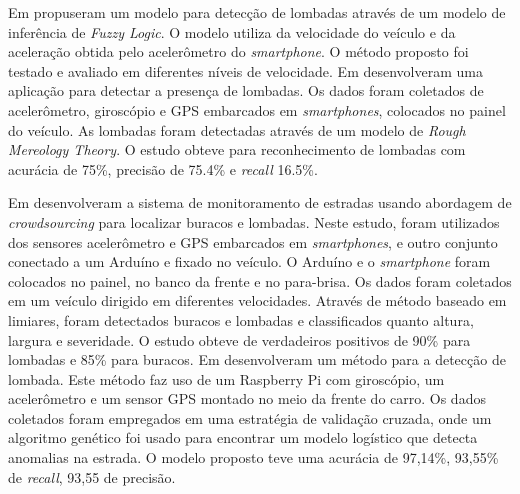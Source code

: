 Em \cite{Aljaafreh2017} propuseram um modelo para detecção de lombadas através de um modelo de inferência de \textit{Fuzzy Logic}. O modelo utiliza da velocidade do veículo e da aceleração obtida pelo acelerômetro do \textit{smartphone}. O método proposto foi testado e avaliado em diferentes níveis de velocidade. Em \cite{Fouad2014} desenvolveram uma aplicação para detectar a presença de lombadas. Os dados foram coletados de acelerômetro, giroscópio e GPS embarcados em \textit{smartphones}, colocados no painel do veículo. As lombadas foram detectadas através de um modelo de \textit{Rough Mereology Theory}. O estudo obteve para reconhecimento de lombadas com acurácia de 75\%, precisão de 75.4\% e \textit{recall} 16.5\%.

Em \cite{Sabir2019} desenvolveram a sistema de monitoramento de estradas usando abordagem de \textit{crowdsourcing} para localizar buracos e lombadas. Neste estudo, foram utilizados dos sensores acelerômetro e GPS embarcados em \textit{smartphones}, e outro conjunto conectado a um Arduíno e fixado no veículo. O Arduíno e o \textit{smartphone} foram colocados no painel, no banco da frente e no para-brisa. Os dados foram coletados em um veículo dirigido em diferentes velocidades. Através de método baseado em limiares, foram detectados buracos e lombadas e classificados quanto altura, largura e severidade. O estudo obteve de verdadeiros positivos de 90\% para lombadas e 85\% para buracos. Em \cite{Padilla2018} desenvolveram um método para a detecção de lombada. Este método faz uso de um Raspberry Pi com giroscópio, um acelerômetro e um sensor GPS montado no meio da frente do carro. Os dados coletados foram empregados em uma estratégia de validação cruzada, onde um algoritmo genético foi usado para encontrar um modelo logístico que detecta anomalias na estrada. O modelo proposto teve uma acurácia de 97,14\%, 93,55\% de \textit{recall}, 93,55 de precisão.

